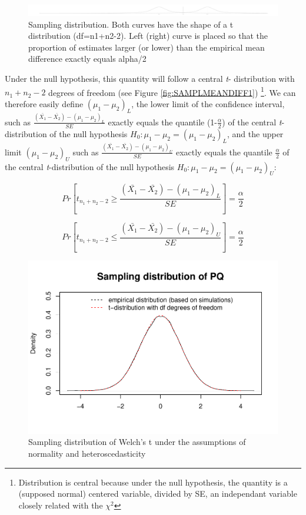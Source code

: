 \documentclass[
  man,floatsintext]{apa6}
\begin{document}
\begin{figure}
\centering
\includegraphics{CI_files/figure-latex/ILLUSTRATION-1.pdf}
\caption{\label{fig:ILLUSTRATION}Sampling distribution. Both curves have the shape of a t distribution (df=n1+n2-2). Left (right) curve is placed so that the proportion of estimates larger (or lower) than the empirical mean difference exactly equals alpha/2}
\end{figure}

Under the null hypothesis, this quantity will follow a central \emph{t}- distribution with \(n_1+n_2-2\) degrees of freedom (see Figure \ref{fig:SAMPLMEANDIFF1}) \footnote{Distribution is central because under the null hypothesis, the quantity is a (supposed normal) centered variable, divided by SE, an independant variable closely related with the $\chi^2$}. We can therefore easily define \((\mu_1-\mu_2)_L\), the lower limit of the confidence interval, such as \(\frac{(\bar{X_1}-\bar{X_2})-(\mu_1-\mu_2)_L}{SE}\) exactly equals the quantile (1-\(\frac{\alpha}{2}\)) of the central \emph{t}-distribution of the null hypothesis \(H_0: \mu_1 - \mu_2 = (\mu_1-\mu_2)_L\), and the upper limit \((\mu_1-\mu_2)_U\) such as \(\frac{(\bar{X_1}-\bar{X_2})-(\mu_1-\mu_2)_U}{SE}\) exactly equals the quantile \(\frac{\alpha}{2}\) of the central \emph{t}-distribution of the null hypothesis \(H_0: \mu_1 - \mu_2 = (\mu_1-\mu_2)_U\):

\begin{equation} 
Pr[t_{n_1+n_2-2} \geq \frac{(\bar{X_1}-\bar{X_2})-(\mu_1-\mu_2)_L}{SE}]= \frac{\alpha}{2}
\label{eq:plausiblelimit1}
\end{equation}

\begin{equation} 
Pr[t_{n_1+n_2-2} \leq \frac{(\bar{X_1}-\bar{X_2})-(\mu_1-\mu_2)_U}{SE}]= \frac{\alpha}{2}
\label{eq:plausiblelimit2}
\end{equation}

\begin{figure}
\centering
\includegraphics{CI_files/figure-latex/SAMPLMEANDIFF2-1.pdf}
\caption{\label{fig:SAMPLMEANDIFF2}Sampling distribution of Welch's t under the assumptions of normality and heteroscedasticity}
\end{figure}
\end{document}
